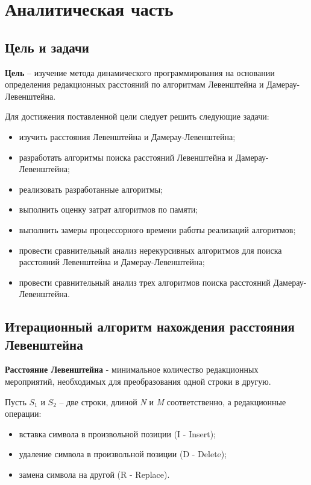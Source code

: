 \chapter{Аналитическая часть}

\section{Цель и задачи}

 \textbf{Цель} -- изучение метода динамического программирования на основании определения редакционных расстояний по алгоритмам Левенштейна и Дамерау-Левенштейна.\newline

Для достижения поставленной цели следует решить следующие задачи:
\begin{itemize}
        \item изучить расстояния Левенштейна и Дамерау-Левенштейна;
        \item разработать алгоритмы поиска расстояний Левенштейна и Дамерау-Левенштейна;
        \item реализовать разработанные алгоритмы;
        \item выполнить оценку затрат алгоритмов по памяти;
        \item выполнить замеры процессорного времени работы реализаций алгоритмов;
        \item провести сравнительный анализ нерекурсивных алгоритмов для поиска расстояний Левенштейна и Дамерау-Левенштейна;
        \item провести сравнительный анализ трех алгоритмов поиска расстояний Дамерау-Левенштейна. \newline
\end{itemize} 

\section{Итерационный алгоритм нахождения расстояния Левенштейна}
\textbf{Расстояние Левенштейна} - минимальное количество редакционных мероприятий, необходимых для преобразования одной строки в другую.\newline

Пусть $S_{1}$ и $S_{2}$ -- две строки, длиной \textit{N} и \textit{M} соответственно, а редакционные операции:
\begin{itemize}
        \item вставка символа в произвольной позиции (I - Insert);
        \item удаление символа в произвольной позиции (D - Delete);
        \item замена символа на другой (R - Replace). \newline
\end{itemize} 

